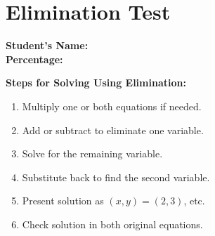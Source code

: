 \documentclass[12pt, a4paper, addpoints]{exam}
\begin{document}
\begin{minipage}{0.3\textwidth}
\section*{Elimination Test}
\end{minipage}
\begin{minipage}{0.7\textwidth}
\raggedleft
\textbf{Student's Name:} \underline{\hspace{7cm}} \\[0.2cm]
\textbf{Percentage:} \underline{\hspace{7cm}} \\
\end{minipage}
\vspace{11mm}
\begin{mdframed}[backgroundcolor=gray!20, roundcorner=5pt] %
\textbf{Steps for Solving Using Elimination:}
\begin{multicols}{2}
\begin{enumerate}
    \item Multiply one or both equations if needed.
    \item Add or subtract to eliminate one variable.
    \item Solve for the remaining variable.
    \item Substitute back to find the second variable.
    \item Present solution as \((x, y) = (2, 3)\), etc.
    \item Check solution in both original equations.
\end{enumerate}
\end{multicols}
\end{mdframed}

\newcommand{\verticalspace}{\vspace{81mm}} 
\end{document}
